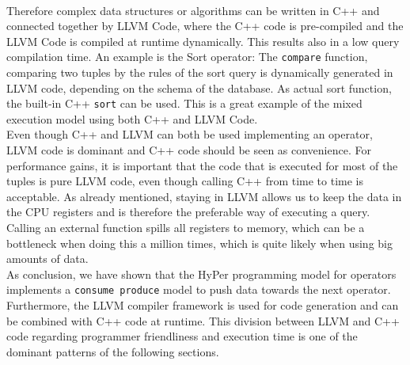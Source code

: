\\
Therefore complex data structures or algorithms can be written in C++ and connected together by LLVM Code, where the C++ code is pre-compiled and the LLVM Code is compiled at runtime dynamically. This results also in a low query compilation time. An example is the Sort operator: The \texttt{compare} function, comparing two tuples by the rules of the sort query is dynamically generated in LLVM code, depending on the schema of the database. As actual sort function, the built-in C++ \texttt{sort} can be used. This is a great example of the mixed execution model using both C++ and LLVM Code.
\\
Even though C++ and LLVM can both be used implementing an operator, LLVM code is dominant and C++ code should be seen as convenience. For performance gains, it is important that the code that is executed for most of the tuples is pure LLVM code, even though calling C++ from time to time is acceptable. As already mentioned, staying in LLVM allows us to keep the data in the CPU registers and is therefore the preferable way of executing a query. Calling an external function spills all registers to memory, which can be a bottleneck when doing this a million times, which is quite likely when using big amounts of data.
\\
As conclusion, we have shown that the HyPer programming model for operators implements a \texttt{consume produce} model to push data towards the next operator. Furthermore, the LLVM compiler framework is used for code generation and can be combined with C++ code at runtime. 
This division between LLVM and C++ code regarding programmer friendliness and execution time is one of the dominant patterns of the following sections.


